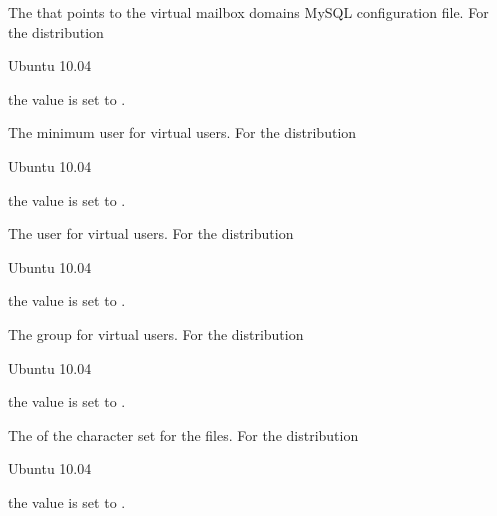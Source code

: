 The  that points to the virtual mailbox domains MySQL configuration file.
For the distribution
\begin{inparaitem}
\item[\TheDistribution{ubuntu}] Ubuntu 10.04
\end{inparaitem}
the value is set to .


The minimum user  for virtual users.
For the distribution
\begin{inparaitem}
\item[\TheDistribution{ubuntu}] Ubuntu 10.04
\end{inparaitem}
the value is set to .


The user  for virtual users.
For the distribution
\begin{inparaitem}
\item[\TheDistribution{ubuntu}] Ubuntu 10.04
\end{inparaitem}
the value is set to .


The group  for virtual users.
For the distribution
\begin{inparaitem}
\item[\TheDistribution{ubuntu}] Ubuntu 10.04
\end{inparaitem}
the value is set to .


The  of the character set for the files.
For the distribution
\begin{inparaitem}
\item[\TheDistribution{ubuntu}] Ubuntu 10.04
\end{inparaitem}
the value is set to .

